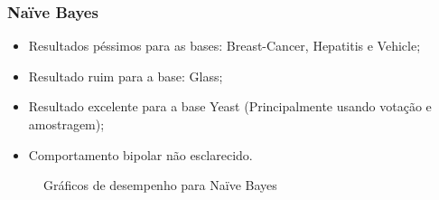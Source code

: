 \begin{frame}
    \frametitle{Naïve Bayes}
    
    \begin{itemize}
        \item Resultados péssimos para as bases: Breast-Cancer, Hepatitis e Vehicle;
        \item Resultado ruim para a base: Glass;
        \item Resultado excelente para a base Yeast (Principalmente usando votação e amostragem);
        \item Comportamento bipolar não esclarecido.
    \end{itemize}
    
    \begin{figure}[H]
        \centering

        \caption{Gráficos de desempenho para Naïve Bayes}
    \end{figure}
\end{frame}

